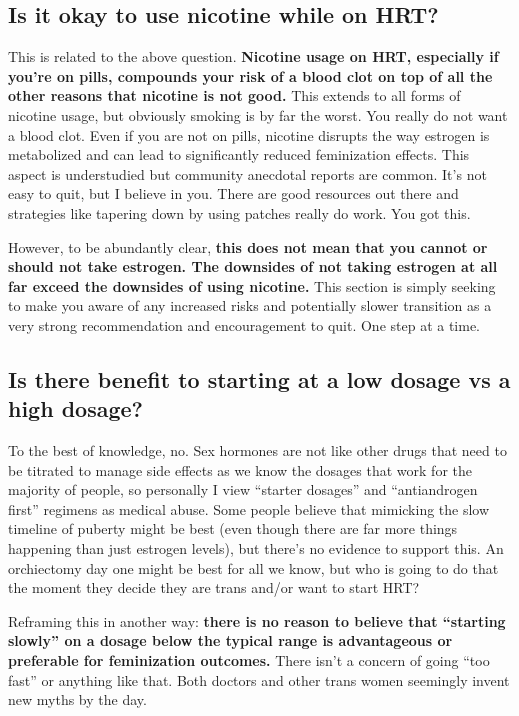\documentclass{article}
\begin{document}
\subsection{Is it okay to use nicotine while on HRT?}\label{11-2}

This is related to the above question. \textbf{Nicotine usage on HRT, especially if you’re on pills, compounds your risk of a blood clot on top of all the other reasons that nicotine is not good.} This extends to all forms of nicotine usage, but obviously smoking is by far the worst. You really do not want a blood clot. Even if you are not on pills, nicotine disrupts the way estrogen is metabolized and can lead to significantly reduced feminization effects. This aspect is understudied but community anecdotal reports are common. It’s not easy to quit, but I believe in you. There are good resources out there and strategies like tapering down by using patches really do work. You got this.

However, to be abundantly clear, \textbf{this does not mean that you cannot or should not take estrogen. The downsides of not taking estrogen at all far exceed the downsides of using nicotine.} This section is simply seeking to make you aware of any increased risks and potentially slower transition as a very strong recommendation and encouragement to quit. One step at a time.

\subsection{Is there benefit to starting at a low dosage vs a high dosage?}

To the best of knowledge, no. Sex hormones are not like other drugs that need to be titrated to manage side effects as we know the dosages that work for the majority of people, so personally I view “starter dosages” and “antiandrogen first” regimens as medical abuse. Some people believe that mimicking the slow timeline of puberty might be best (even though there are far more things happening than just estrogen levels), but there’s no evidence to support this. An orchiectomy day one might be best for all we know, but who is going to do that the moment they decide they are trans and/or want to start HRT?

Reframing this in another way: \textbf{there is no reason to believe that “starting slowly” on a dosage below the typical range is advantageous or preferable for feminization outcomes.} There isn't a concern of going “too fast” or anything like that. Both doctors and other trans women seemingly invent new myths by the day. 
\end{document}
